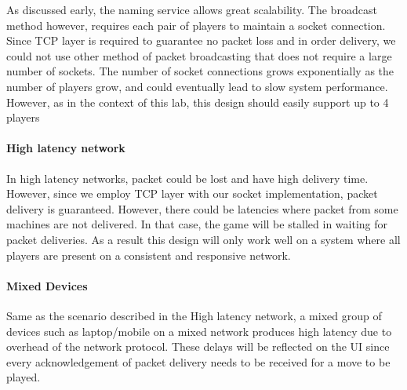 As discussed early, the naming service allows great scalability. The broadcast method however, requires each pair of players to maintain a socket connection. Since TCP layer is required to guarantee no packet loss and in order delivery, we could not use other method of packet broadcasting that does not require a large number of sockets. The number of socket connections grows exponentially as the number of players grow, and could eventually lead to slow system performance. However, as in the context of this lab, this design should easily support up to 4 players

\paragraph*{High latency network}

In high latency networks, packet could be lost and have high delivery time. However, since we employ TCP layer with our socket implementation, packet delivery is guaranteed. However, there could be latencies where packet from some machines are not delivered. In that case, the game will be stalled in waiting for packet deliveries. As a result this design will only work well on a system where all players are present on a consistent and responsive network.

\paragraph*{Mixed Devices}

Same as the scenario described in the High latency network, a mixed group of devices such as laptop/mobile on a mixed network produces high latency due to overhead of the network protocol. These delays will be reflected on the UI since every acknowledgement of packet delivery needs to be received for a move to be played.
